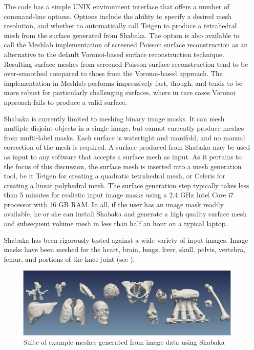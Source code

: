The code has a simple UNIX environment interface that offers a number of command-line options. Options include the ability to specify a desired mesh resolution, and whether to automatically call Tetgen to produce a tetrahedral mesh from the surface generated from Shabaka. The option is also available to call the Meshlab implementation of screened Poisson surface reconstruction as an alternative to the default Voronoi-based surface reconstruction technique. Resulting surface meshes from screened Poisson surface reconstruction tend to be over-smoothed compared to those from the Voronoi-based approach. The implementation in Meshlab performs impressively fast, though, and tends to be more robust for particularly challenging surfaces, where in rare cases Voronoi approach fails to produce a valid surface.

Shabaka is currently limited to meshing binary image masks. It can mesh multiple disjoint objects in a single image, but cannot currently produce meshes from multi-label masks. Each surface is watertight and manifold, and no manual correction of the mesh is required. A surface produced from Shabaka may be used as input to any software that accepts a surface mesh as input. As it pertains to the focus of this discussion, the surface mesh is inserted into a mesh generation tool, be it Tetgen for creating a quadratic tetrahedral mesh, or Celeris for creating a linear polyhedral mesh. The surface generation step typically takes less than 5 minutes for realistic input image masks using a 2.4 GHz Intel Core i7 processor with 16 GB RAM. In all, if the user has an image mask readily available, he or she can install Shabaka and generate a high quality surface mesh and subsequent volume mesh in less than half an hour on a typical laptop.

Shabaka has been rigorously tested against a wide variety of input images. Image masks have been meshed for the heart, brain, lungs, liver, skull, pelvis, vertebra, femur, and portions of the knee joint (see ).

\begin{figure}
\centering
\vspace{2.5mm}
\includegraphics[width=1.0\textwidth]{media/2-shabaka/2-surf/6-showcase.png}
\caption{Suite of example meshes generated from image data using Shabaka}
\label{fig:showcase}
\end{figure}
